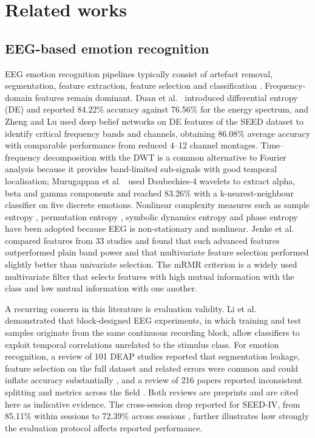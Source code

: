 \section{Related works}
\label{sec:related}

\subsection{EEG-based emotion recognition}
EEG emotion recognition pipelines typically consist of artefact removal, segmentation, feature extraction, feature selection and classification \cite{Alarcao2019}. Frequency-domain features remain dominant. Duan et al.\ \cite{Duan2013} introduced differential entropy (DE) and reported 84.22\% accuracy against 76.56\% for the energy spectrum, and Zheng and Lu \cite{ZhengLu2015} used deep belief networks on DE features of the SEED dataset to identify critical frequency bands and channels, obtaining 86.08\% average accuracy with comparable performance from reduced 4--12 channel montages. Time--frequency decomposition with the DWT is a common alternative to Fourier analysis because it provides band-limited sub-signals with good temporal localisation; Murugappan et al.\ \cite{Murugappan2010} used Daubechies-4 wavelets to extract alpha, beta and gamma components and reached 83.26\% with a k-nearest-neighbour classifier on five discrete emotions. Nonlinear complexity measures such as sample entropy \cite{Richman2000}, permutation entropy \cite{Bandt2002}, symbolic dynamics entropy \cite{Zebrowski2000} and phase entropy \cite{Rohila2019} have been adopted because EEG is non-stationary and nonlinear. Jenke et al.\ \cite{Jenke2014} compared features from 33 studies and found that such advanced features outperformed plain band power and that multivariate feature selection performed slightly better than univariate selection. The mRMR criterion \cite{Peng2005} is a widely used multivariate filter that selects features with high mutual information with the class and low mutual information with one another.

A recurring concern in this literature is evaluation validity. Li et al.\ \cite{Li2021} demonstrated that block-designed EEG experiments, in which training and test samples originate from the same continuous recording block, allow classifiers to exploit temporal correlations unrelated to the stimulus class. For emotion recognition, a review of 101 DEAP studies reported that segmentation leakage, feature selection on the full dataset and related errors were common and could inflate accuracy substantially \cite{Khan2025}, and a review of 216 papers reported inconsistent splitting and metrics across the field \cite{Kukhilava2025}. Both reviews are preprints and are cited here as indicative evidence. The cross-session drop reported for SEED-IV, from 85.11\% within sessions to 72.39\% across sessions \cite{Zheng2019}, further illustrates how strongly the evaluation protocol affects reported performance.

